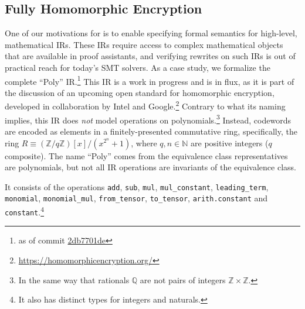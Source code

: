 \subsection{Fully Homomorphic Encryption}
\label{sec:mlir:fully-homomorphic-encryption}

One of our motivations for  is to enable specifying formal semantics for high-level, mathematical IRs.
These IRs require access to complex mathematical objects that are available in proof assistants, 
and verifying rewrites on such IRs is out of practical reach for today's SMT solvers.
As a case study, we formalize the complete ``Poly'' IR.\footnote{as of commit \href{https://github.com/google/heir/tree/2db7701de976f0277f7d3b8be9c65315c647cf79/include/Dialect/Poly}{2db7701de}}
This IR is a work in progress and is in flux, as it is part of the discussion of an upcoming open standard for homomorphic encryption, developed in collaboration by Intel and Google.\footnote{\url{https://homomorphicencryption.org/}}
Contrary to what its naming implies, this IR does \emph{not} model operations on polynomials.\footnote{In the same way that rationals $\mathbb{Q}$ are not pairs of integers $\mathbb{Z} \times \mathbb{Z}$.}
Instead, codewords are encoded as elements in a finitely-presented commutative ring, specifically, the ring $R \equiv (\mathbb{Z}/q\mathbb{Z})[x]/(x^{2^n} + 1)$, where $q, n \in \mathbb{N}$ are positive integers ($q$ composite).
The name ``Poly'' comes from the equivalence class representatives are polynomials, but not all IR operations are invariants of the equivalence class.

It consists of the operations \texttt{add}, \texttt{sub}, \texttt{mul}, \texttt{mul\_constant}, \texttt{leading\_term}, \texttt{monomial}, \texttt{monomial\_mul}, \texttt{from\_tensor}, \texttt{to\_tensor}, \texttt{arith.constant} and \texttt{constant}.\footnote{It also has distinct types for integers and naturals.}

